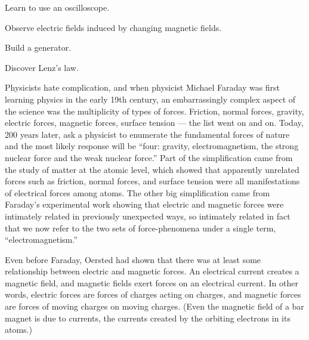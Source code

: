 
\label{lab:electromagnetism}

\apparatus
{}

\begin{goals}

\item[] Learn to use an oscilloscope.

\item[] Observe electric fields induced by changing magnetic fields.

\item[] Build a generator.

\item[] Discover Lenz's law.
\end{goals}

\introduction

Physicists hate complication, and when physicist Mich\-ael
Faraday was first learning physics in the early 19th
century, an embarrassingly complex aspect of the science was
the multiplicity of types of forces. Friction, normal
forces, gravity, electric forces, magnetic forces, surface
tension --- the list went on and on. Today, 200 years later,
ask a physicist to enumerate the fundamental forces of
nature and the most likely response will be ``four: gravity,
electromagnetism, the strong nuclear force and the weak
nuclear force.'' Part of the simplification came from the
study of matter at the atomic level, which showed that
apparently unrelated forces such as friction, normal forces,
and surface tension were all manifestations of electrical
forces among atoms. The other big simplification came from
Faraday's experimental work showing that electric and
magnetic forces were intimately related in previously
unexpected ways, so intimately related in fact that we now
refer to the two sets of force-phenomena under a single
term, ``electromagnetism.''

Even before Faraday, Oersted had shown that there was at
least some relationship between electric and magnetic
forces. An electrical current creates a magnetic field, and
magnetic fields exert forces on an electrical current. In
other words, electric forces are forces of charges acting on
charges, and magnetic forces are forces of moving charges on
moving charges. (Even the magnetic field of a bar magnet is
due to currents, the currents created by the orbiting
electrons in its atoms.)

